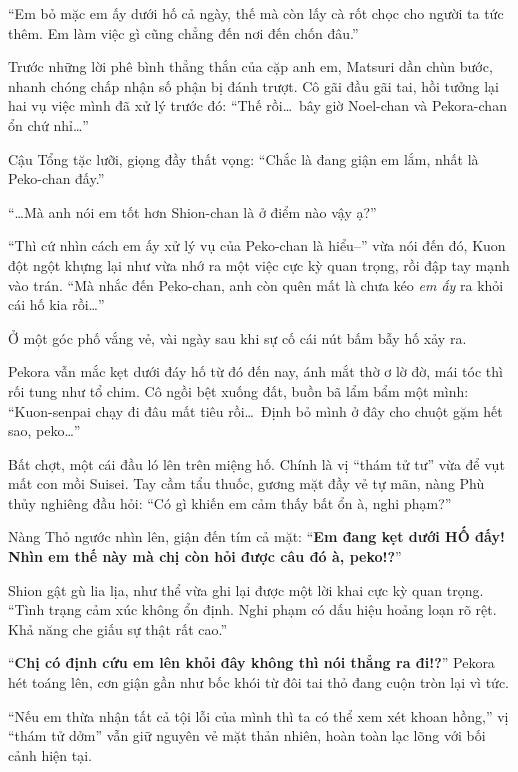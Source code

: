 \documentclass[../main.tex]{subfiles}
\begin{document}
``Em bỏ mặc em ấy dưới hố cả ngày, thế mà còn lấy cà rốt chọc cho người ta tức thêm. Em làm việc gì cũng chẳng đến nơi đến chốn đâu.''

Trước những lời phê bình thẳng thắn của cặp anh em, Matsuri dần chùn bước, nhanh chóng chấp nhận số phận bị đánh trượt. Cô gãi đầu gãi tai, hồi tưởng lại hai vụ việc mình đã xử lý trước đó: ``Thế rồi\dots\ bây giờ Noel-chan và Pekora-chan ổn chứ nhỉ\dots''

Cậu Tổng tặc lưỡi, giọng đầy thất vọng: ``Chắc là đang giận em lắm, nhất là Peko-chan đấy.''

``\dots Mà anh nói em tốt hơn Shion-chan là ở điểm nào vậy ạ?''

``Thì cứ nhìn cách em ấy xử lý vụ của Peko-chan là hiểu--'' vừa nói đến đó, Kuon đột ngột khựng lại như vừa nhớ ra một việc cực kỳ quan trọng, rồi đập tay mạnh vào trán. ``Mà nhắc đến Peko-chan, anh còn quên mất là chưa kéo \emph{em ấy} ra khỏi cái hố kia rồi\dots''

\ct

Ở một góc phố vắng vẻ, vài ngày sau khi sự cố cái nút bấm bẫy hố xảy ra.

Pekora vẫn mắc kẹt dưới đáy hố từ đó đến nay, ánh mắt thờ ơ lờ đờ, mái tóc thì rối tung như tổ chim. Cô ngồi bệt xuống đất, buồn bã lẩm bẩm một mình: ``Kuon-senpai chạy đi đâu mất tiêu rồi\dots\ Định bỏ mình ở đây cho chuột gặm hết sao, peko\dots''

Bất chợt, một cái đầu ló lên trên miệng hố. Chính là vị ``thám tử tư'' vừa để vụt mất con mồi Suisei. Tay cầm tẩu thuốc, gương mặt đầy vẻ tự mãn, nàng Phù thủy nghiêng đầu hỏi: ``Có gì khiến em cảm thấy bất ổn à, nghi phạm?''

Nàng Thỏ ngước nhìn lên, giận đến tím cả mặt: ``\textbf{Em đang kẹt dưới HỐ đấy! Nhìn em thế này mà chị còn hỏi được câu đó à, peko!?}''


Shion gật gù lia lịa, như thể vừa ghi lại được một lời khai cực kỳ quan trọng. ``Tình trạng cảm xúc không ổn định. Nghi phạm có dấu hiệu hoảng loạn rõ rệt. Khả năng che giấu sự thật rất cao.''

``\textbf{Chị có định cứu em lên khỏi đây không thì nói thẳng ra đi!?}'' Pekora hét toáng lên, cơn giận gần như bốc khói từ đôi tai thỏ đang cuộn tròn lại vì tức.

``Nếu em thừa nhận tất cả tội lỗi của mình thì ta có thể xem xét khoan hồng,'' vị ``thám tử dởm'' vẫn giữ nguyên vẻ mặt thản nhiên, hoàn toàn lạc lõng với bối cảnh hiện tại.
\end{document}
